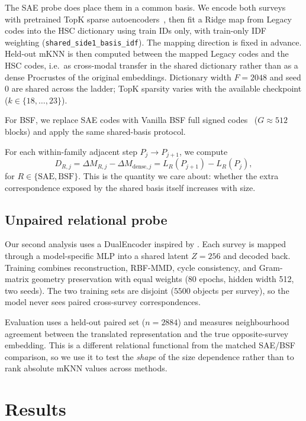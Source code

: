 \documentclass{article}
\begin{document}
The SAE probe does place them in a common basis.
We encode both surveys with pretrained TopK sparse autoencoders~\citep{gao2025sae}, then fit a Ridge map from Legacy codes into the HSC dictionary using train IDs only, with train-only IDF weighting (\texttt{shared\_side1\_basis\_idf}).
The mapping direction is fixed in advance.
Held-out mKNN is then computed between the mapped Legacy codes and the HSC codes, i.e.\ as cross-modal transfer in the shared dictionary rather than as a dense Procrustes of the original embeddings.
Dictionary width \(F{=}2048\) and seed \(0\) are shared across the ladder; TopK sparsity varies with the available checkpoint (\(k\in\{18,\ldots,23\}\)).

For BSF, we replace SAE codes with Vanilla BSF full signed codes~\citep{fel2026bsf} (\(G{\approx}512\) blocks) and apply the same shared-basis protocol.

For each within-family adjacent step \(P_j\to P_{j+1}\), we compute
\[
D_{R,j}
=
\Delta M_{R,j}
-
\Delta M_{\mathrm{dense},j}
=
L_R(P_{j+1})-L_R(P_j),
\]
for \(R\in\{\mathrm{SAE},\mathrm{BSF}\}\).
This is the quantity we care about: whether the extra correspondence exposed by the shared basis itself increases with size.

\subsection{Unpaired relational probe}

Our second analysis uses a DualEncoder inspired by \citet{jha2025vec2vec}.
Each survey is mapped through a model-specific MLP into a shared latent \(Z{=}256\) and decoded back.
Training combines reconstruction, RBF-MMD, cycle consistency, and Gram-matrix geometry preservation with equal weights (80 epochs, hidden width 512, two seeds).
The two training sets are disjoint (\(5500\) objects per survey), so the model never sees paired cross-survey correspondences.

Evaluation uses a held-out paired set (\(n{=}2884\)) and measures neighbourhood agreement between the translated representation and the true opposite-survey embedding.
This is a different relational functional from the matched SAE/BSF comparison, so we use it to test the \emph{shape} of the size dependence rather than to rank absolute mKNN values across methods.

\section{Results}
\label{sec:results}
\end{document}
